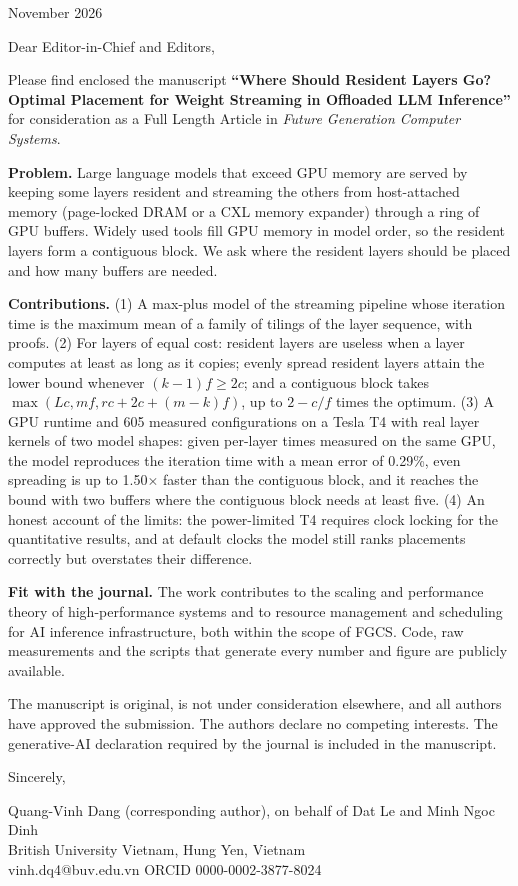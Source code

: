 \documentclass[11pt]{article}
\begin{document}
\begin{flushright}November 2026\end{flushright}

Dear Editor-in-Chief and Editors,

Please find enclosed the manuscript \textbf{``Where Should Resident Layers Go? Optimal Placement for Weight Streaming in Offloaded LLM Inference''} for consideration as a Full Length Article in \emph{Future Generation Computer Systems}.

\textbf{Problem.} Large language models that exceed GPU memory are served by keeping some layers resident and streaming the others from host-attached memory (page-locked DRAM or a CXL memory expander) through a ring of GPU buffers. Widely used tools fill GPU memory in model order, so the resident layers form a contiguous block. We ask where the resident layers should be placed and how many buffers are needed.

\textbf{Contributions.} (1) A max-plus model of the streaming pipeline whose iteration time is the maximum mean of a family of tilings of the layer sequence, with proofs. (2) For layers of equal cost: resident layers are useless when a layer computes at least as long as it copies; evenly spread resident layers attain the lower bound whenever $(k-1)f\ge2c$; and a contiguous block takes $\max(Lc,mf,rc+2c+(m-k)f)$, up to $2-c/f$ times the optimum. (3) A GPU runtime and 605 measured configurations on a Tesla T4 with real layer kernels of two model shapes: given per-layer times measured on the same GPU, the model reproduces the iteration time with a mean error of 0.29\%, even spreading is up to 1.50$\times$ faster than the contiguous block, and it reaches the bound with two buffers where the contiguous block needs at least five. (4) An honest account of the limits: the power-limited T4 requires clock locking for the quantitative results, and at default clocks the model still ranks placements correctly but overstates their difference.

\textbf{Fit with the journal.} The work contributes to the scaling and performance theory of high-performance systems and to resource management and scheduling for AI inference infrastructure, both within the scope of FGCS. Code, raw measurements and the scripts that generate every number and figure are publicly available.

The manuscript is original, is not under consideration elsewhere, and all authors have approved the submission. The authors declare no competing interests. The generative-AI declaration required by the journal is included in the manuscript.

Sincerely,

Quang-Vinh Dang (corresponding author), on behalf of Dat Le and Minh Ngoc Dinh\\
British University Vietnam, Hung Yen, Vietnam\\
vinh.dq4@buv.edu.vn \quad ORCID 0000-0002-3877-8024
\end{document}
